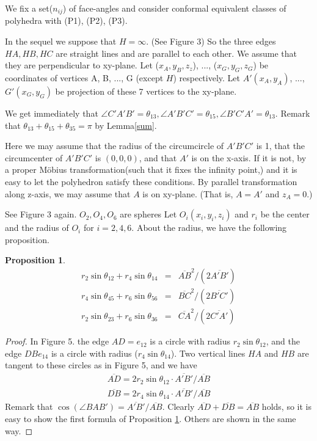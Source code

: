 \documentclass[dvipdfmx]{interact}
\theoremstyle{plain}%
\newtheorem{proposition}[theorem]{Proposition}
\theoremstyle{definition}
\theoremstyle{remark}
\theoremstyle{problemstyle}
\begin{document}
We fix a set($n_{ij}$) of face-angles and consider conformal equivalent
classes of polyhedra with (P1), (P2), (P3).

In the sequel we suppose that $H = \infty$. (See Figure 3) So the three
edges $HA, HB, HC$ are straight lines and are parallel to each other. We
assume that they are perpendicular to xy-plane.
Let ($x_A, y_B, z_z$), ..., ($x_G, y_G, z_G$) be coordinates of vertices
A, B, ..., G (except $H$) respectively. Let $A'(x_A, y_A)$, ...,$G'(x_G,
y_G)$ be projection of these 7 vertices to the xy-plane.

We get immediately that $\angle C'A'B' = \theta_{13}, \angle A'B'C' =
\theta_{15}, \angle B'C'A'=\theta_{13}$. Remark that $\theta_{13} +
\theta_{15} + \theta_{35} = \pi$ by Lemma\ref{sum}.

Here we may assume that the radius of the circumcircle of $A'B'C'$ is 1,
that the circumcenter of $A'B'C'$ is $(0, 0, 0)$, and that $A'$ is on
the x-axis. If it is not, by a proper M\"obius transformation(such that
it fixes the infinity point,) and it is easy to let the polyhedron
satisfy these conditions. By parallel transformation along z-axis, we
may assume that $A$ is on xy-plane. (That is, $A = A'$ and $z_A = 0.$)

See Figure 3 again. $O_2, O_4, O_6$ are spheres Let $O_i(x_i, y_i, z_i)$
and $r_i$ be the center and the radius of $O_i$ for $i = 2, 4, 6.$ About
the radius, we have the following proposition.

\begin{proposition}\label{angles}
 \begin{eqnarray}
 r_2\sin\theta_{12} + r_4\sin\theta_{14} &=& \overline{AB}^2 / (2\overline{A'B'})\\
 r_4\sin\theta_{45} + r_6\sin\theta_{56} &=& \overline{BC}^2 / (2\overline{B'C'})\\
 r_2\sin\theta_{23} + r_6\sin\theta_{36} &=& \overline{CA}^2 / (2\overline{C'A'})
 \end{eqnarray}
\end{proposition}

\begin{proof}
 In Figure 5. the edge $AD = e_{12}$ is a circle with radius
 $r_2\sin\theta_{12}$, and the edge $DB e_{14}$ is a circle with radius
 ($r_4\sin\theta_{14}$).
Two vertical lines $HA$ and $HB$ are tangent to these circles as in
 Figure 5,
 and we have 
 \begin{eqnarray*}
  \overline{AD} = 2 r_2 \sin\theta_{12} \cdot \overline{A'B'}/\overline{AB}\\
  \overline{DB} = 2 r_4 \sin\theta_{14} \cdot \overline{A'B'}/\overline{AB}
 \end{eqnarray*}
 Remark that $\cos(\angle BAB') =\overline{A'B'}/\overline{AB}.$ Clearly
 $\overline{AD} + \overline{DB} = \overline{AB}$ holds, so it is easy to
 show the first formula of Proposition \ref{angles}. Others are shown in the same
 way.

\end{proof}
\end{document}
